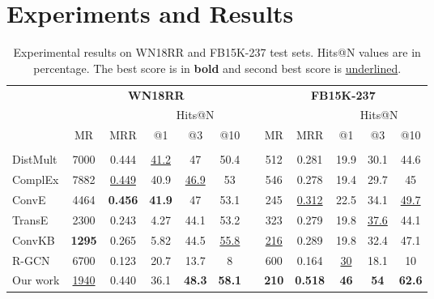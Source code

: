 \documentclass[11pt,a4paper]{article}
\begin{document}
\section{Experiments and Results}\label{experiments}
\begin{table*}[t!]
\centering\small
\setlength{\tabcolsep}{4pt} \renewcommand{\arraystretch}{1} \begin{tabular}{lccccclccccc}
\hline
& \multicolumn{5}{c}{\textbf{WN18RR}} &  & \multicolumn{5}{c}{\textbf{FB15K-237}}         \\ \cline{2-6} \cline{8-12} 

&  &  & \multicolumn{3}{c}{Hits@N} &  &  &  & \multicolumn{3}{c}{Hits@N} \\ \cline{4-6} \cline{10-12} 

& MR & MRR & @1 & @3 & @10 &    & MR & MRR & @1 & @3 & @10    \\
\hline
        \\
DistMult \cite{yang2014} & 7000 & 0.444 & \underline{41.2} & 47 & 50.4 &    & 512 & 0.281 & 19.9 & 30.1 & 44.6  \\

ComplEx \cite{trouillon2016complex} & 7882 & \underline{0.449} & 40.9 & \underline{46.9} & 53 &    & 546 & 0.278 & 19.4 & 29.7 & 45 \\

ConvE \cite{dettmers2018convolutional} & 4464 & \textbf{0.456} & \textbf{41.9} & 47 & 53.1 &    & 245 & \underline{0.312} & 22.5 & 34.1 & \underline{49.7} \\

TransE \cite{NIPS2013_5071} & 2300 & 0.243 & 4.27 & 44.1 & 53.2 &    & 323 & 0.279 & 19.8     & \underline{37.6} & 44.1    \\

ConvKB \cite{nguyen2018novel} & \textbf{1295} & 0.265 & 5.82 & 44.5 & \underline{55.8} &    & \underline{216} & 0.289 & 19.8 & 32.4 & 47.1   \\

R-GCN \cite{schlichtkrull2018modeling} & 6700 & 0.123 & 20.7 & 13.7 & 8 &    & 600 & 0.164 & \underline{30} & 18.1 & 10 
\\

\hline
Our work & \underline{1940} & 0.440 & 36.1 & \textbf{48.3} & \textbf{58.1} &    & \textbf{210} & \textbf{0.518} & \textbf{46} & \textbf{54} & \textbf{62.6}   \\

\hline
\end{tabular}
\caption{Experimental results on WN18RR and FB15K-237 test sets. Hits@N values are in percentage. The best score is in \textbf{bold} and second best score is \underline{underlined}.
  }\label{tb:results1}
\end{table*}
\fi
\end{document}
